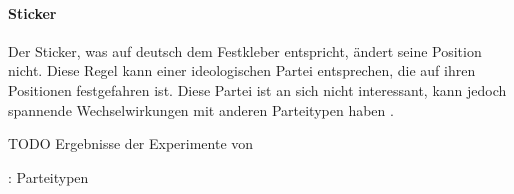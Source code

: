 \paragraph{Sticker} Der Sticker, was auf deutsch dem Festkleber entspricht, ändert seine Position nicht. Diese Regel kann einer ideologischen Partei entsprechen, die auf ihren Positionen festgefahren ist. Diese Partei ist an sich nicht interessant, kann jedoch spannende Wechselwirkungen mit anderen Parteitypen haben \citep[S.\,267]{laver2005policy}.

TODO Ergebnisse der Experimente von \citep{laver2005policy}

\citet{laver2007endogenousParties}: Parteitypen %
